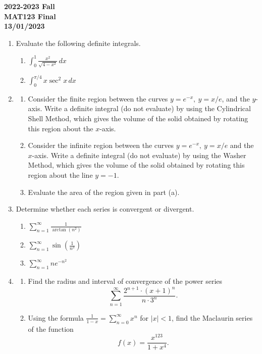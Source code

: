\documentclass[a4paper, 12pt]{article}
\begin{document}
\newpage
{}
{}

\begin{center}
\textbf{2022-2023 Fall\\MAT123 Final\\13/01/2023}
\end{center}

\begin{enumerate}[leftmargin=*,label=\textbf{\arabic*.}]
\item Evaluate the following definite integrals.
\begin{enumerate}[leftmargin=*,label=\textbf{\alph*.}]
\item $\displaystyle\int_0^1\frac{x^2}{\sqrt{4-x^2}}\,dx$
\item $\displaystyle\int_0^{\pi/4}x\sec^2x\,dx$
\end{enumerate}

\item
\begin{enumerate}[leftmargin=*,label=\textbf{\alph*.}]
\item Consider the finite region between the curves $y= e^{-x},\:y=x/ e$, and the $y$-axis. Write a definite integral (do not evaluate) by using the Cylindrical Shell Method, which gives the volume of the solid obtained by rotating this region about the $x$-axis.

\item Consider the infinite region between the curves $y= e^{-x},\:y=x/ e$ and the $x$-axis. Write a definite integral (do not evaluate) by using the Washer Method, which gives the volume of the solid obtained by rotating this region about the line $y=-1$.

\item Evaluate the area of the region given in part (a).
\end{enumerate}

\item Determine whether each series is convergent or divergent.
\begin{enumerate}[leftmargin=*,label=\textbf{\alph*.}]
\item $\displaystyle\sum_{n=1}^\infty\frac1{\arctan\left(n^2\right)}$
\item $\displaystyle\sum_{n=1}^\infty\sin\left(\frac1{n^3}\right)$
\item $\displaystyle\sum_{n=1}^\infty n e^{-n^2}$
\end{enumerate}

\item
\begin{enumerate}[leftmargin=*,label=\textbf{\alph*.}]
\item Find the radius and interval of convergence of the power series
\[\sum_{n=1}^\infty\frac{2^{n+1}\cdot(x+1)^n}{n\cdot3^n}.\]

\item Using the formula $\displaystyle\frac1{1-x}=\sum_{n=0}^\infty x^n$ for $\left|x\right|<1$, find the Maclaurin series of the function
\[f(x)=\frac{x^{123}}{1+x^4}.\]
\end{enumerate}
\end{enumerate}
\end{document}

